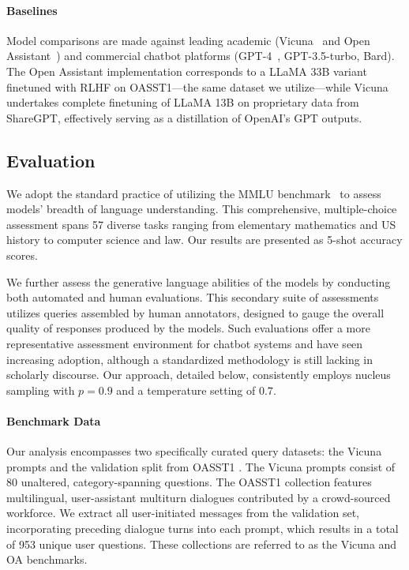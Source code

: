 \paragraph{Baselines} Model comparisons are made against leading academic (Vicuna~\citep{vicuna2023} and Open Assistant~\citep{kopf2023openassistant}) and commercial chatbot platforms (GPT-4~\citep{openai2023gpt}, GPT-3.5-turbo, Bard). The Open Assistant implementation corresponds to a LLaMA 33B variant finetuned with RLHF on OASST1—the same dataset we utilize—while Vicuna undertakes complete finetuning of LLaMA 13B on proprietary data from ShareGPT, effectively serving as a distillation of OpenAI's GPT outputs.

\subsection{Evaluation}

We adopt the standard practice of utilizing the MMLU benchmark~\citep{hendrycksmeasuring} to assess models' breadth of language understanding. This comprehensive, multiple-choice assessment spans 57 diverse tasks ranging from elementary mathematics and US history to computer science and law. Our results are presented as 5-shot accuracy scores.

We further assess the generative language abilities of the models by conducting both automated and human evaluations. This secondary suite of assessments utilizes queries assembled by human annotators, designed to gauge the overall quality of responses produced by the models. Such evaluations offer a more representative assessment environment for chatbot systems and have seen increasing adoption, although a standardized methodology is still lacking in scholarly discourse. Our approach, detailed below, consistently employs nucleus sampling with $p=0.9$ and a temperature setting of $0.7$.

\paragraph{Benchmark Data} Our analysis encompasses two specifically curated query datasets: the Vicuna prompts \citep{vicuna2023} and the validation split from OASST1 \citep{kopf2023openassistant}. The Vicuna prompts consist of 80 unaltered, category-spanning questions. The OASST1 collection features multilingual, user-assistant multiturn dialogues contributed by a crowd-sourced workforce. We extract all user-initiated messages from the validation set, incorporating preceding dialogue turns into each prompt, which results in a total of 953 unique user questions. These collections are referred to as the Vicuna and OA benchmarks.

